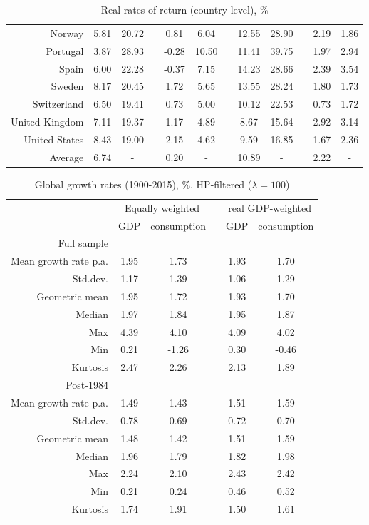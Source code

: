 {{\begin{table}[H]
\begin{center}
\begin{tabular}{rccccccccccc}
Norway & 5.81 & 20.72 & & 0.81 & 6.04 & & 12.55 & 28.90 & & 2.19 & 1.86\\
Portugal & 3.87 & 28.93 & & -0.28 & 10.50 & & 11.41 & 39.75 & & 1.97 & 2.94 \\
Spain & 6.00 & 22.28 & & -0.37 &  7.15 & & 14.23 & 28.66 & & 2.39 & 3.54\\
Sweden & 8.17 & 20.45 & & 1.72 & 5.65 & & 13.55 & 28.24 & & 1.80 & 1.73\\
Switzerland & 6.50 & 19.41 & & 0.73 & 5.00 & & 10.12 & 22.53 & & 0.73 & 1.72 \\
United Kingdom & 7.11 & 19.37 & & 1.17 & 4.89 & & 8.67 & 15.64 & & 2.92 & 3.14\\
United States & 8.43 & 19.00 & & 2.15 & 4.62 & & 9.59 & 16.85 & & 1.67 & 2.36 \\
\hline
Average & 6.74 & - & & 0.20 & - & & 10.89 & - & & 2.22 & -\\
\hline
\hline
\end{tabular} 
\end{center}
\caption{Real rates of return (country-level), \%}
\label{tab:real_returns_countries}
\end{table}

{\renewcommand{\arraystretch}{1.0}
\begin{table}[H]
\begin{center}
\begin{tabular}{rccccc}
\hline
\hline
& \multicolumn{2}{c}{Equally weighted} & & \multicolumn{2}{c}{real GDP-weighted} \\
\cline{2-3} \cline{5-6}
& GDP & consumption & & GDP & consumption\\
\hline
Full sample & & & & &\\
\hline
Mean growth rate p.a. & 1.95 & 1.73 & & 1.93 & 1.70\\
Std.dev. & 1.17 & 1.39 & & 1.06 & 1.29\\
Geometric mean & 1.95 & 1.72 & & 1.93 & 1.70\\
Median & 1.97 & 1.84 & & 1.95 & 1.87\\
Max & 4.39 & 4.10 & & 4.09 & 4.02\\
Min & 0.21 & -1.26 & & 0.30 & -0.46\\
Kurtosis & 2.47 & 2.26 & & 2.13 & 1.89\\
\hline
Post-1984 & & & & &\\
\hline
Mean growth rate p.a. & 1.49 & 1.43 & & 1.51 & 1.59\\
Std.dev. & 0.78 & 0.69 & & 0.72 & 0.70\\
Geometric mean & 1.48 & 1.42 & & 1.51 & 1.59\\
Median & 1.96 & 1.79 & & 1.82 & 1.98\\
Max & 2.24 & 2.10 & & 2.43 & 2.42\\
Min & 0.21 & 0.24 & & 0.46 & 0.52\\
Kurtosis & 1.74 & 1.91 & & 1.50 & 1.61\\
\hline
\hline
\end{tabular} 
\end{center}
\caption{Global growth rates (1900-2015), \%, HP-filtered ($\lambda=100$)}
\label{tab:global_growth_HP}
\end{table}

}}}
